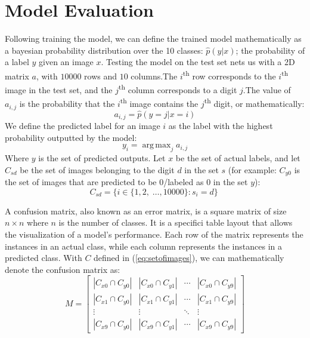 \documentclass[conference]{IEEEtran}
\DeclareMathOperator*{\argmax}{arg\,max}
\begin{document}
\section{Model Evaluation}\label{sec:test}
Following training the model, we can define the trained model mathematically as a bayesian probability distribution over the 10 classes: $\hat{p}(y | x)$; the probability of a label $y$ given an image $x$.
Testing the model on the test set nets us with a 2D matrix $a$, with $10000$ rows and $10$ columns.\@ The $i$\textsuperscript{th} row corresponds to the $i$\textsuperscript{th} image in the test set, and the $j$\textsuperscript{th} column corresponds to a digit $j$.\@ The value of $a_{i,j}$ is the probability that the $i$\textsuperscript{th} image contains the $j$\textsuperscript{th} digit, or mathematically:
\begin{equation}
    a_{i,j} = \hat{p}(y = j | x = i)
\end{equation}
We define the predicted label for an image $i$ as the label with the highest probability outputted by the model:
\begin{equation}
    y_i = \argmax_j a_{i,j}
\end{equation}
Where $y$ is the set of predicted outputs. Let $x$ be the set of actual labels, and let $C_{sd}$ be the set of images belonging to the digit $d$ in the set $s$ (for example: $C_{y0}$ is the set of images that are predicted to be 0/labeled as 0 in the set $y$):
\begin{equation}
    C_{sd} = \{i \in \{1, 2, \;\ldots, 10000\} : s_i = d\}
    \;\label{eq:setofimages}
\end{equation}
\par A confusion matrix, also known as an error matrix, is a square matrix of size $n \times n$ where $n$ is the number of classes. It is a specifici table layout that allows the visualization of a model's performance. Each row of the matrix represents the instances in an actual class, while each column represents the instances in a predicted class\cite{Stehman1997}. With $C$ defined in (\ref{eq:setofimages}), we can mathematically denote the confusion matrix as:
\begin{equation}
    M = \begin{bmatrix}
        |C_{x0} \cap C_{y0}| & |C_{x0} \cap C_{y1}| & \cdots & |C_{x0} \cap C_{y9}| \\
        |C_{x1} \cap C_{y0}| & |C_{x1} \cap C_{y1}| & \cdots & |C_{x1} \cap C_{y9}| \\
        \vdots & \vdots & \ddots & \vdots \\
        |C_{x9} \cap C_{y0}| & |C_{x9} \cap C_{y1}| & \cdots & |C_{x9} \cap C_{y9}|
    \end{bmatrix}
\end{equation}
\end{document}
